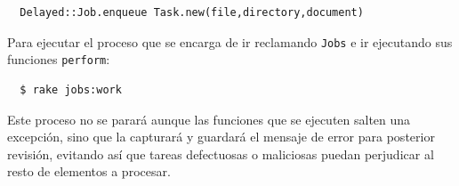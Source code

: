 \begin{verbatim}
  Delayed::Job.enqueue Task.new(file,directory,document)
\end{verbatim}

Para ejecutar el proceso que se encarga de ir reclamando \texttt{Jobs} e ir ejecutando sus funciones \texttt{perform}:

\begin{verbatim}
  $ rake jobs:work
\end{verbatim}

Este proceso no se parará aunque las funciones que se ejecuten salten una excepción, sino que la capturará y guardará el mensaje de error para posterior revisión, evitando así que tareas defectuosas o maliciosas puedan perjudicar al resto de elementos a procesar.


